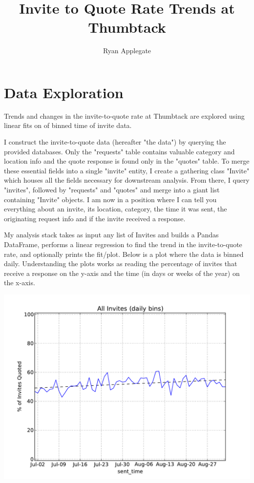 \documentclass{article}[12pt]
\title{Invite to Quote Rate Trends at Thumbtack}
\author{Ryan Applegate}
\begin{document}
\maketitle

\section{Data Exploration}

Trends and changes in the invite-to-quote rate at Thumbtack are explored
using linear fits on of binned time of invite data.

I construct the invite-to-quote data (hereafter "the data") by querying the
provided databases. Only the "requests" table contains valuable category and
location info and the quote response is found only in the "quotes" table. To
merge these essential fields into a single "invite" entity, I create a gathering
class "Invite" which houses all the fields necessary for downstream analysis. From
there, I query "invites", followed by "requests" and "quotes" and merge into a giant
list containing "Invite" objects. I am now in a position where I can tell you everything
about an invite, its location, category, the time it was sent, the originating request info
and if the invite received a response.

My analysis stack takes as input any list of Invites and builds a Pandas DataFrame,
performs a linear regression to find the trend in the invite-to-quote rate, and optionally
prints the fit/plot. Below is a plot where the data is binned daily. Understanding the plots
works as reading the percentage of invites that receive a response on the y-axis and the time
(in days or weeks of the year) on the x-axis. 

\includegraphics[scale=0.7]{../All_Invites_daily.pdf}
\end{document}
